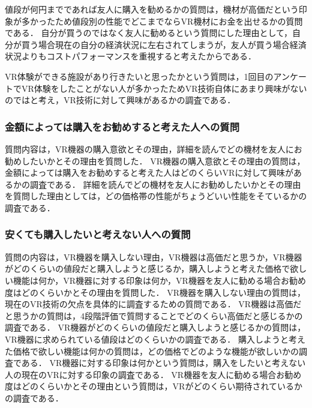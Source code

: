 \documentclass[12pt,a4j]{ltjsarticle}
\begin{document}
値段が何円までであれば友人に購入を勧めるかの質問は，機材が高価だという印象が多かったため値段別の性能でどこまでならVR機材にお金を出せるかの質問である．
自分が買うのではなく友人に勧めるという質問にした理由として，自分が買う場合現在の自分の経済状況に左右されてしまうが，友人が買う場合経済状況よりもコストパフォーマンスを重視すると考えたからである．

VR体験ができる施設があり行きたいと思ったかという質問は，1回目のアンケートでVR体験をしたことがない人が多かったためVR技術自体にあまり興味がないのではと考え，VR技術に対して興味があるかの調査である．

\subsubsection{金額によっては購入をお勧めすると考えた人への質問}
質問内容は，VR機器の購入意欲とその理由，詳細を読んでどの機材を友人にお勧めしたいかとその理由を質問した．
VR機器の購入意欲とその理由の質問は，金額によっては購入をお勧めすると考えた人はどのくらいVRに対して興味があるかの調査である．
詳細を読んでどの機材を友人にお勧めしたいかとその理由を質問した理由としては，どの価格帯の性能がちょうどいい性能をそているかの調査である．


\subsubsection{安くても購入したいと考えない人への質問}
質問の内容は，VR機器を購入しない理由，VR機器は高価だと思うか，VR機器がどのくらいの値段だと購入しようと感じるか，購入しようと考えた価格で欲しい機能は何か，VR機器に対する印象は何か，VR機器を友人に勧める場合お勧め度はどのくらいかとその理由を質問した．
VR機器を購入しない理由の質問は，現在のVR技術の欠点を具体的に調査するための質問である．
VR機器は高価だと思うかの質問は，4段階評価で質問することでどのくらい高価だと感じるかの調査である．
VR機器がどのくらいの値段だと購入しようと感じるかの質問は，VR機器に求められている値段はどのくらいかの調査である．
購入しようと考えた価格で欲しい機能は何かの質問は，どの価格でどのような機能が欲しいかの調査である．
VR機器に対する印象は何かという質問は，購入をしたいと考えない人の現在のVRに対する印象の調査である．
VR機器を友人に勧める場合お勧め度はどのくらいかとその理由という質問は，VRがどのくらい期待されているかの調査である．
\end{document}

